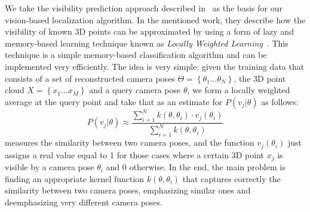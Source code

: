 We take the visibility prediction approach described
in~\cite{Alcantarilla11icra} as the basis for our vision-based
localization algorithm. In the mentioned work, they describe how the
visibility of known 3D points can be approximated by using a form of
lazy and memory-based learning technique known as \textit{Locally
  Weighted Learning}~\cite{Atkeson97ai}. This technique is a simple
memory-based classification algorithm and can be implemented very
efficiently. The idea is very simple: given the training data that
consists of a set of reconstructed camera poses $\Theta =
\left\{\theta_1 \ldots \theta_N \right\}$, the 3D point cloud $X =
\left\{x_1 \ldots x_M\right\}$ and a query camera pose $\theta$, we
form a locally weighted average at the query point and take that as an
estimate for $P(v_{j} \vert \theta)$ as follows:
%
\begin{equation} \label{eq:locally_weighted}
 P(v_j \vert \theta) \approx \frac{\sum\limits_{i=1}^{N} k(\theta,\theta_{i})\cdot v_j(\theta_i)}{\sum\limits_{i=1}^{N} k(\theta,\theta_{i})}
\end{equation}
measures the similarity between two camera poses, and the function
$v_{j}(\theta_i)$ just assigns a real value equal to 1 for those cases
where a certain 3D point $x_{j}$ is visible by a camera pose
$\theta_{i}$ and 0 otherwise. In the end, the main problem is finding
an appropriate kernel function $k(\theta,\theta_{i})$ that captures
correctly the similarity between two camera poses, emphasizing similar
ones and deemphasizing very different camera poses.

